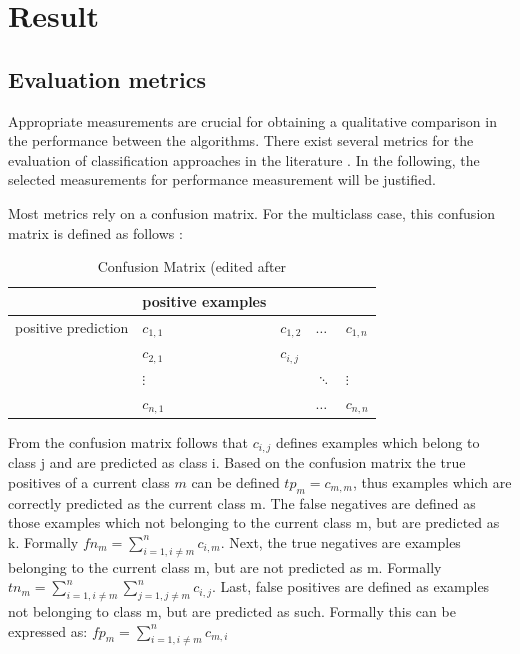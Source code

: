 \documentclass[12pt, a4paper, titlepage]{article}
\begin{document}
\section{Result}
\subsection{Evaluation metrics}
Appropriate measurements are crucial for obtaining a qualitative comparison in the performance between the algorithms. There exist several metrics for the evaluation of classification approaches in the literature \citep{Fatourechi2008}. In the following, the selected measurements for performance measurement will be justified. 

Most metrics rely on a confusion matrix. For the multiclass case, this confusion matrix is defined as follows \citep{Kautz2017}: 
\begin{table}[hb!]
  \center
  \begin{tabular}{lllll}
  \hline
            & positive examples      &           &             &             \\ \hline
  positive prediction  & $c_{1,1}$ & $c_{1,2}$ & $\dots$     & $c_{1,n}$   \\
            & $c_{2,1}$ & $c_{i,j}$ &             &             \\
            &  $\vdots$         &           & $\ddots$ &   $\vdots$\\
            & $c_{n,1}$ &           & $\dots$     & $c_{n,n}$   \\ \hline
  \end{tabular}
  \caption{\label{tab: T1} Confusion Matrix (edited after \citep[113]{Kautz2017}}
  \end{table}

From the confusion matrix follows that $c_{i, j}$ defines examples which belong to class j and are predicted as class i. Based on the confusion matrix the true positives of a current class $m$ can be defined $tp_{m} = c_{m, m}$, thus examples which are correctly predicted as the current class m. The false negatives are defined as those examples which not belonging to the current class m, but are predicted as k. Formally $fn_{m} = \sum_{i=1, i \neq m}^n c_{i, m}$. Next, the true negatives are examples belonging to the current class m, but are not predicted as m. Formally $tn_{m} = \sum_{i=1, i\neq m}^n \sum_{j=1, j \neq m}^n c_{i,j}$. Last, false positives are defined as examples not belonging to class m, but are predicted as such. Formally this can be expressed as: $fp_{m} =  \sum_{i=1, i \neq m}^n c_{m, i}$ \citep{Kautz2017}
\end{document}

